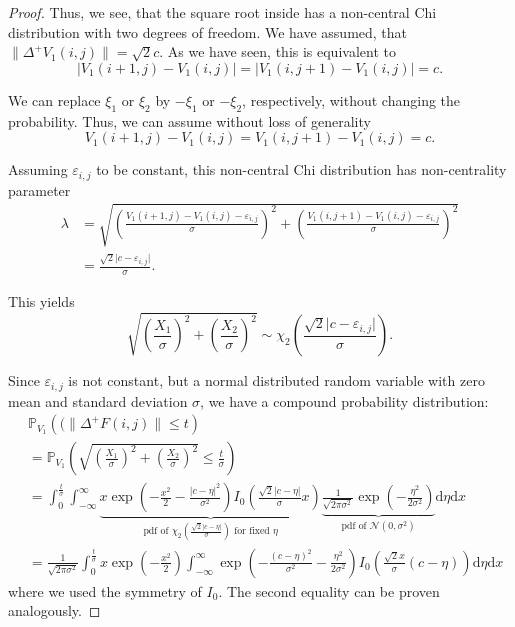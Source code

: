 \documentclass[a4paper,12pt]{article}
\newcommand{\abs}[1]{\lvert#1\rvert}
\newcommand{\norm}[1]{\lVert#1\rVert}
\theoremstyle{plain}
\theoremstyle{definition}
\begin{document}
\begin{proof}
	Thus, we see, that the square root inside has a non-central Chi distribution with two degrees of freedom. We have assumed, that $\norm{\Delta^+ V_1(i, j)} = \sqrt{2} c$. As we have seen, this is equivalent to
	\begin{equation*}
		\abs{V_1(i + 1, j) - V_1(i, j)} = \abs{V_1(i, j + 1) - V_1(i, j)} = c.
	\end{equation*}
	
	We can replace $\xi_1$ or $\xi_2$ by $- \xi_1$ or $- \xi_2$, respectively, without changing the probability. Thus, we can assume without loss of generality
	\begin{equation*}
		V_1(i + 1, j) - V_1(i, j) = V_1(i, j + 1) - V_1(i, j) = c.
	\end{equation*}
	
	Assuming $\varepsilon_{i, j}$ to be constant, this non-central Chi distribution has non-centrality parameter
	\begin{align*}
		\lambda &= \sqrt{\left( \frac{V_1(i + 1, j) - V_1(i, j) - \varepsilon_{i, j}}{\sigma} \right)^2 + \left( \frac{V_1(i, j + 1) - V_1(i, j) - \varepsilon_{i, j}}{\sigma} \right)^2} \\
		&= \frac{\sqrt{2} \abs{c - \varepsilon_{i, j}}}{\sigma}.
	\end{align*}
	
	This yields
	\begin{equation*}
		\sqrt{\left( \frac{X_1}{\sigma} \right)^2 + \left( \frac{X_2}{\sigma} \right)^2} \sim \chi_2 \left( \frac{\sqrt{2} \abs{c - \varepsilon_{i, j}}}{\sigma} \right).
	\end{equation*}
	
	Since $\varepsilon_{i, j}$ is not constant, but a normal distributed random variable with zero mean and standard deviation $\sigma$, we have a compound probability distribution:
	\begin{align*}
		&\mathbb{P}_{V_1}\left(( \norm{\Delta^+ F(i, j)} \leq t \right) \\
		&= \mathbb{P}_{V_1}\left( \sqrt{\left( \frac{X_1}{\sigma} \right)^2 + \left( \frac{X_2}{\sigma} \right)^2} \leq \frac{t}{\sigma} \right) \\
		&= \int_0^\frac{t}{\sigma} \int_{-\infty}^\infty \underbrace{x \exp \left( - \frac{x^2}{2} - \frac{\abs{c - \eta}^2}{\sigma^2} \right) I_0 \left( \frac{\sqrt{2} \abs{c - \eta}}{\sigma} x \right)}_{\textrm{pdf of } \chi_2 \left( \frac{\sqrt{2} \abs{c - \eta}}{\sigma} \right) \textrm{ for fixed } \eta} \underbrace{\frac{1}{\sqrt{2 \pi \sigma^2}} \exp \left( - \frac{\eta^2}{2 \sigma^2} \right)}_{\textrm{pdf of } \mathcal{N}(0, \sigma^2)} \mathrm{d}\eta \mathrm{d}x \\
		&= \frac{1}{\sqrt{2 \pi \sigma^2}} \int_0^\frac{t}{\sigma} x \exp \left( - \frac{x^2}{2} \right) \int_{-\infty}^\infty \exp \left( - \frac{(c - \eta)^2}{\sigma^2} - \frac{\eta^2}{2 \sigma^2} \right) I_0 \left( \frac{\sqrt{2} x}{\sigma} (c - \eta) \right) \mathrm{d}\eta \mathrm{d}x
	\end{align*}
	where we used the symmetry of $I_0$. The second equality can be proven analogously.
\end{proof}
\end{document}

